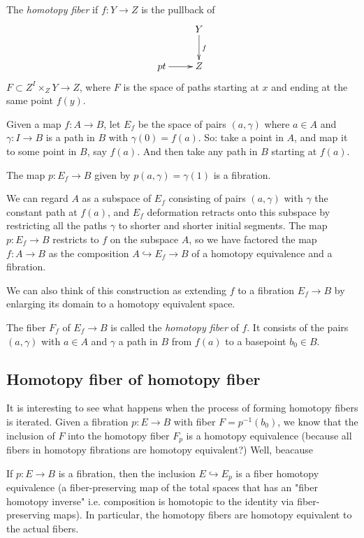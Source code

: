 \begin{definition}
\label{definition-lectu-notes-looks-incom}
	The {\it homotopy fiber} if $f:Y\to Z$ is
	the pullback of
		$$
		\xymatrix{
			&Y\ar[d]^{f}\\
			pt\ar[r]&Z
		}
		$$
		$F\subset Z^I\times_ZY\to Z$, where $F$ is
		the space of paths starting at $x$ and
		ending at the same point $f(y)$.
\end{definition}

\begin{definition}
\label{definition-homot-fiber-concr-const}
	Given a map $f:A\to B$, let $E_f$ be the
	space of pairs $(a,\gamma)$ where $a\in A$
	and $\gamma:I\to B$ is a path in $B$ with
	$\gamma(0)=f(a)$. So: take a point in $A$,
	and map it to some point in $B$, say $f(a)$.
	And then take any path in $B$ starting at $f
	(a)$.
\begin{proposition}
\label{proposition-map-p-e-f-b-given-p}
	The map $p:E_f\to B$ given by
	$p(a,\gamma)=\gamma(1)$ is a fibration.
\end{proposition}
We can regard $A$ as a subspace of $E_{f}$
consisting of pairs $(a,\gamma)$ with
$\gamma$ the constant path at $f(a)$, and
$E_f$ deformation retracts onto this subspace
by restricting all the paths $\gamma$ to
shorter and shorter initial segments. The map
$p:E_f\to B$ restricts to $f$ on the subspace
$A$, so we have factored the map $f:A\to B$
as the composition $A\hookrightarrow E_f\to
B$ of a homotopy equivalence and a fibration.

We can also think of this construction as
extending $f$ to a fibration $E_f\to B$ by
enlarging its domain to a homotopy equivalent
space.

The fiber $F_f$ of $E_f\to B$ is called the
{\it homotopy fiber} of $f$. It consists of
the pairs $(a,\gamma)$ with $a\in A$ and
$\gamma$ a path in $B$ from $f(a)$ to a
basepoint $b_0\in B$.
\end{definition}

\subsection{Homotopy fiber of homotopy fiber}
\label{subsection-homot-fiber-homot-fiber}

It is interesting to see what happens when
the process of forming homotopy fibers is
iterated. Given a fibration $p:E\to B$ with
fiber $F=p^{-1} (b_0)$, we know that the
inclusion of $F$ into the homotopy fiber
$F_{p}$ is a homotopy equivalence (because
all fibers in homotopy fibrations are
homotopy equivalent?) Well, beacause
\begin{proposition}[4.66]
\label{proposition-4-66}
	If $p:E\to B$ is a fibration, then the
	inclusion $E\hookrightarrow E_p$ is a fiber
	homotopy equivalence (a fiber-preserving map
	of the total spaces that has an "fiber
	homotopy inverse" i.e. composition is
	homotopic to the identity via
	fiber-preserving maps). In particular, the
	homotopy fibers are homotopy equivalent to
	the actual fibers.
\end{proposition}

